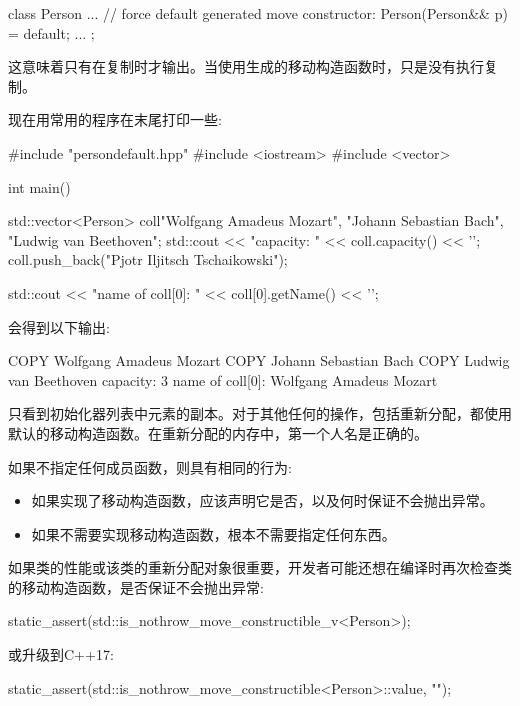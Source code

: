 \begin{cppcode}
class Person {
	...
	// force default generated move constructor:
	Person(Person&& p) = default;
	...
};
\end{cppcode}

这意味着只有在复制时才输出。当使用生成的移动构造函数时，只是没有执行复制。

现在用常用的程序在末尾打印一些:

\begin{cppcode}
#include "persondefault.hpp"
#include <iostream>
#include <vector>

int main()
{
	std::vector<Person> coll{"Wolfgang Amadeus Mozart",
		"Johann Sebastian Bach",
		"Ludwig van Beethoven"};
	std::cout << "capacity: " << coll.capacity() << '\n';
	coll.push_back("Pjotr Iljitsch Tschaikowski");

	std::cout << "name of coll[0]: " << coll[0].getName() << '\n';
}
\end{cppcode}

会得到以下输出:

\begin{outputcode}
COPY Wolfgang Amadeus Mozart
COPY Johann Sebastian Bach
COPY Ludwig van Beethoven
capacity: 3
name of coll[0]: Wolfgang Amadeus Mozart
\end{outputcode}

只看到初始化器列表中元素的副本。对于其他任何的操作，包括重新分配，都使用默认的移动构造函数。在重新分配的内存中，第一个人名是正确的。

如果不指定任何成员函数，则具有相同的行为:

\begin{itemize}
	\item 如果实现了移动构造函数，应该声明它是否，以及何时保证不会抛出异常。
	\item 如果不需要实现移动构造函数，根本不需要指定任何东西。
\end{itemize}

如果类的性能或该类的重新分配对象很重要，开发者可能还想在编译时再次检查类的移动构造函数，是否保证不会抛出异常:

\begin{cppcode}
static_assert(std::is_nothrow_move_constructible_v<Person>);
\end{cppcode}

或升级到C++17:

\begin{cppcode}
static_assert(std::is_nothrow_move_constructible<Person>::value, "");
\end{cppcode}

